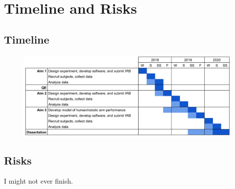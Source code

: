\documentclass[float=false, crop=false]{standalone}
\begin{document}
\section{Timeline and Risks}
\subsection{Timeline}

\begin{figure}[h!]
    \begin{center}
        \includegraphics[width=\linewidth]{./../img/image1.png}
    \end{center}
\end{figure}

\subsection{Risks}
I might not ever finish.
\end{document}
